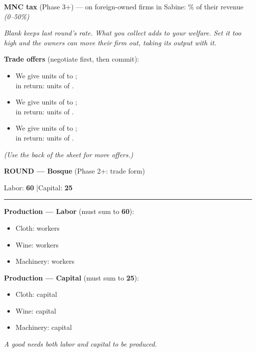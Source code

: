 \documentclass[11pt]{article}
\newcommand{\blank}[1]{\underline{\hspace{#1}}}
\newcommand{\hr}{\par\vspace{2pt}\noindent\rule{\linewidth}{0.4pt}\par\vspace{2pt}}
\begin{document}
\vspace{4pt}
{\bfseries MNC tax} (Phase 3+) --- on foreign-owned firms in Sabine: \blank{1.4cm}\% of their revenue \quad \textit{(0--50\%)}\par
\textit{Blank keeps last round's rate. What you collect adds to your welfare. Set it too high and the owners can move their firm out, taking its output with it.}

\vspace{4pt}
{\bfseries Trade offers} (negotiate first, then commit):\par
\begin{itemize}[itemsep=4pt,leftmargin=1.4em]
  \item We give \blank{1.8cm} units of \blank{2.2cm} to \blank{2.2cm};\\[2pt] in return: \blank{1.8cm} units of \blank{2.2cm}.
  \item We give \blank{1.8cm} units of \blank{2.2cm} to \blank{2.2cm};\\[2pt] in return: \blank{1.8cm} units of \blank{2.2cm}.
  \item We give \blank{1.8cm} units of \blank{2.2cm} to \blank{2.2cm};\\[2pt] in return: \blank{1.8cm} units of \blank{2.2cm}.
\end{itemize}
\textit{(Use the back of the sheet for more offers.)}

\newpage

{\large\bfseries ROUND \blank{1cm} --- Bosque} \hfill (Phase 2+: trade form)\par
Labor: \textbf{60} \quad|\quad Capital: \textbf{25}
\hr

{\bfseries Production --- Labor} (must sum to \textbf{60}):\par
\begin{itemize}[nosep,leftmargin=1.4em]
  \item Cloth: \blank{2.5cm} workers
  \item Wine: \blank{2.5cm} workers
  \item Machinery: \blank{2.5cm} workers
\end{itemize}

{\bfseries Production --- Capital} (must sum to \textbf{25}):\par
\begin{itemize}[nosep,leftmargin=1.4em]
  \item Cloth: \blank{2.5cm} capital
  \item Wine: \blank{2.5cm} capital
  \item Machinery: \blank{2.5cm} capital
\end{itemize}
\textit{A good needs \emph{both} labor and capital to be produced.}
\end{document}
